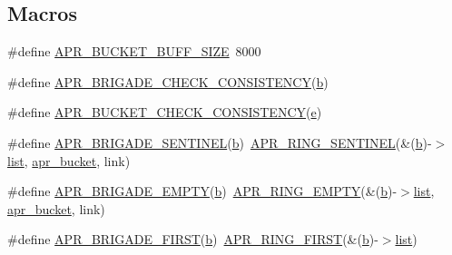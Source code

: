 \subsection*{Macros}
\begin{DoxyCompactItemize}
\item 
\#define \hyperlink{group__APR__Util__Bucket__Brigades_ga82bf404af30875135c65e2c13ad035e5}{A\+P\+R\+\_\+\+B\+U\+C\+K\+E\+T\+\_\+\+B\+U\+F\+F\+\_\+\+S\+I\+ZE}~8000
\item 
\#define \hyperlink{group__APR__Util__Bucket__Brigades_gae1dfe8bf117d10e7dc5b8e0c08f0ebb2}{A\+P\+R\+\_\+\+B\+R\+I\+G\+A\+D\+E\+\_\+\+C\+H\+E\+C\+K\+\_\+\+C\+O\+N\+S\+I\+S\+T\+E\+N\+CY}(\hyperlink{group__APR__Util__Bucket__Brigades_ga11dc1bdeac74315dbed17465c98879e9}{b})
\item 
\#define \hyperlink{group__APR__Util__Bucket__Brigades_gaedaeb3fbe71aac408377471b8a54dc08}{A\+P\+R\+\_\+\+B\+U\+C\+K\+E\+T\+\_\+\+C\+H\+E\+C\+K\+\_\+\+C\+O\+N\+S\+I\+S\+T\+E\+N\+CY}(\hyperlink{pcregrep_8txt_acd90314acb2c2e5cd19681136c08efac}{e})
\item 
\#define \hyperlink{group__APR__Util__Bucket__Brigades_ga858da66dccab1e063415678bb115788a}{A\+P\+R\+\_\+\+B\+R\+I\+G\+A\+D\+E\+\_\+\+S\+E\+N\+T\+I\+N\+EL}(\hyperlink{group__APR__Util__Bucket__Brigades_ga11dc1bdeac74315dbed17465c98879e9}{b})~\hyperlink{group__apr__ring_ga54210090292ebafcd0a0d75d9ff1563d}{A\+P\+R\+\_\+\+R\+I\+N\+G\+\_\+\+S\+E\+N\+T\+I\+N\+EL}(\&(\hyperlink{group__APR__Util__Bucket__Brigades_ga11dc1bdeac74315dbed17465c98879e9}{b})-\/$>$\hyperlink{pcregrep_8txt_aeb6b944e4524f915483b5696b7f2f424}{list}, \hyperlink{structapr__bucket}{apr\+\_\+bucket}, link)
\item 
\#define \hyperlink{group__APR__Util__Bucket__Brigades_ga836f61da6cce15074eff257ce4b6fc0f}{A\+P\+R\+\_\+\+B\+R\+I\+G\+A\+D\+E\+\_\+\+E\+M\+P\+TY}(\hyperlink{group__APR__Util__Bucket__Brigades_ga11dc1bdeac74315dbed17465c98879e9}{b})~\hyperlink{group__apr__ring_ga9b64ad6eebea19f896d2aa90172b6b9a}{A\+P\+R\+\_\+\+R\+I\+N\+G\+\_\+\+E\+M\+P\+TY}(\&(\hyperlink{group__APR__Util__Bucket__Brigades_ga11dc1bdeac74315dbed17465c98879e9}{b})-\/$>$\hyperlink{pcregrep_8txt_aeb6b944e4524f915483b5696b7f2f424}{list}, \hyperlink{structapr__bucket}{apr\+\_\+bucket}, link)
\item 
\#define \hyperlink{group__APR__Util__Bucket__Brigades_gab5826a11eb6ba90786a94282f806c230}{A\+P\+R\+\_\+\+B\+R\+I\+G\+A\+D\+E\+\_\+\+F\+I\+R\+ST}(\hyperlink{group__APR__Util__Bucket__Brigades_ga11dc1bdeac74315dbed17465c98879e9}{b})~\hyperlink{group__apr__ring_gacacd9cfca24feb7ff754d4008422efcb}{A\+P\+R\+\_\+\+R\+I\+N\+G\+\_\+\+F\+I\+R\+ST}(\&(\hyperlink{group__APR__Util__Bucket__Brigades_ga11dc1bdeac74315dbed17465c98879e9}{b})-\/$>$\hyperlink{pcregrep_8txt_aeb6b944e4524f915483b5696b7f2f424}{list})

\end{DoxyCompactItemize}
